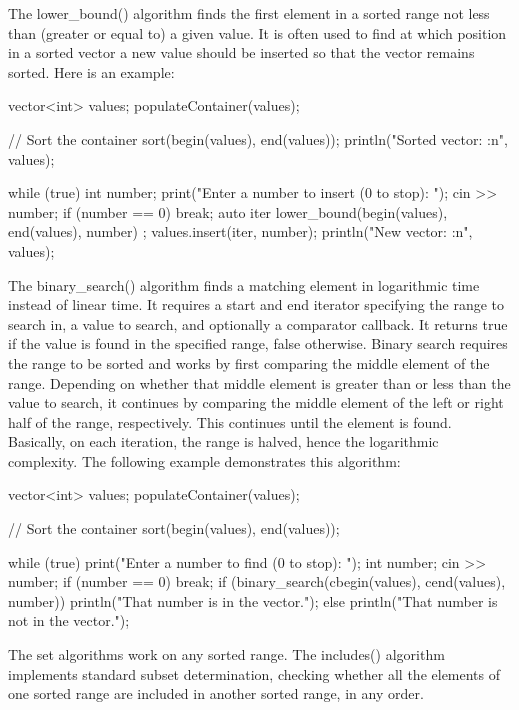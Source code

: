 The lower\_bound() algorithm finds the first element in a sorted range not less than (greater or equal to) a given value. It is often used to find at which position in a sorted vector a new value should be inserted so that the vector remains sorted. Here is an example:

\begin{cpp}
vector<int> values;
populateContainer(values);

// Sort the container
sort(begin(values), end(values));
println("Sorted vector: {:n}", values);

while (true) {
    int number;
    print("Enter a number to insert (0 to stop): ");
    cin >> number;
    if (number == 0) { break; }
    auto iter { lower_bound(begin(values), end(values), number) };
    values.insert(iter, number);
    println("New vector: {:n}", values);
}
\end{cpp}

The binary\_search() algorithm finds a matching element in logarithmic time instead of linear time. It requires a start and end iterator specifying the range to search in, a value to search, and optionally a comparator callback. It returns true if the value is found in the specified range, false otherwise. Binary search requires the range to be sorted and works by first comparing the middle element of the range. Depending on whether that middle element is greater than or less than the value to search, it continues by comparing the middle element of the left or right half of the range, respectively. This continues until the element is found. Basically, on each iteration, the range is halved, hence the logarithmic complexity. The following example demonstrates this algorithm:

\begin{cpp}
vector<int> values;
populateContainer(values);

// Sort the container
sort(begin(values), end(values));

while (true) {
    print("Enter a number to find (0 to stop): ");
    int number;
    cin >> number;
    if (number == 0) { break; }
    if (binary_search(cbegin(values), cend(values), number)) {
        println("That number is in the vector.");
    } else {
        println("That number is not in the vector.");
    }
}
\end{cpp}


The set algorithms work on any sorted range. The includes() algorithm implements standard subset determination, checking whether all the elements of one sorted range are included in another sorted range, in any order.

